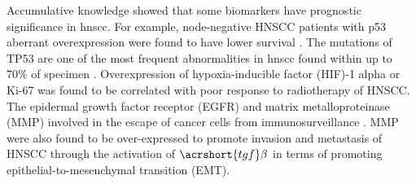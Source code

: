 \documentclass[12pt, a4paper]{article}
\begin{document}




Accumulative knowledge showed that some biomarkers have prognostic significance in \acrshort{hnscc}. For example, node-negative HNSCC patients with p53 aberrant overexpression were found to have lower survival \citep{DeVicente2004}.
The mutations of TP53 are one of the most frequent abnormalities in \acrshort{hnscc} found within up to 70\% of specimen \citep{Alsner2001, Singh2016, Wang2017, WARD2018}.
Overexpression of hypoxia-inducible factor (HIF)-1 alpha \citep{Aebersold2001} or Ki-67 \citep{Couture2002} was found to be correlated with poor response to radiotherapy of HNSCC. The epidermal growth factor receptor (EGFR) \citep{O-Charoenrat2000} \citep{Bentzen2005} and matrix metalloproteinase (MMP) involved in the escape of cancer cells from immunosurveillance \citep{Stefanidakis2006}. MMP were also found to be over-expressed to promote invasion and metastasis of HNSCC \citep{Harrington2017} through the activation of $\acrshort{tgf}\beta$ in terms of promoting epithelial-to-mesenchymal transition (EMT). 
\end{document}
